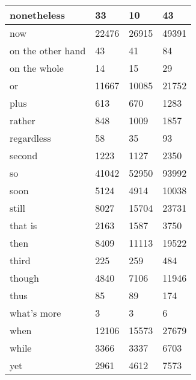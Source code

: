 \documentclass[11pt,letterpaper]{article}
\begin{document}
\begin{figure*}[t]
\begin{appendices}
\begin{tabular}{|l|l|l|l|}
\hline
nonetheless & 33 & 10 & 43 \\
\hline
now & 22476 & 26915 & 49391 \\
\hline
on the other hand & 43 & 41 & 84 \\
\hline
on the whole & 14 & 15 & 29 \\
\hline
or & 11667 & 10085 & 21752 \\
\hline
plus & 613 & 670 & 1283 \\
\hline
rather & 848 & 1009 & 1857 \\
\hline
regardless & 58 & 35 & 93 \\
\hline
second & 1223 & 1127 & 2350 \\
\hline
so & 41042 & 52950 & 93992 \\
\hline
soon & 5124 & 4914 & 10038 \\
\hline
still & 8027 & 15704 & 23731 \\
\hline
that is & 2163 & 1587 & 3750 \\
\hline
then & 8409 & 11113 & 19522 \\
\hline
third & 225 & 259 & 484 \\
\hline
though & 4840 & 7106 & 11946 \\
\hline
thus & 85 & 89 & 174 \\
\hline
what's more & 3 & 3 & 6 \\
\hline
when & 12106 & 15573 & 27679 \\
\hline
while & 3366 & 3337 & 6703 \\
\hline
yet & 2961 & 4612 & 7573 \\
\hline
\end{tabular}
\label{table:counts}
\end{appendices}
\end{figure*}
\end{document}
